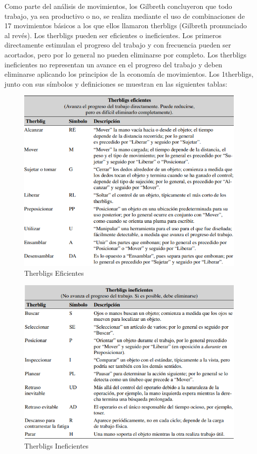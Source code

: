     Como parte del análisis de movimientos, los Gilbreth concluyeron que todo trabajo, ya sea productivo o no, se realiza mediante el uso de combinaciones de 17 movimientos básicos a los que ellos 
    llamaron therbligs (Gilbreth pronunciado al revés). Los therbligs pueden ser eficientes o ineficientes. 
    Los primeros directamente estimulan el progreso del trabajo y con frecuencia pueden ser acortados, pero por lo general no pueden eliminarse por completo. Los therbligs ineficientes no representan un avance en el progreso del trabajo y deben eliminarse aplicando los principios de la economía de movimientos. Los 1therbligs, junto con sus símbolos y definiciones se muestran en las siguientes tablas:
    
    \begin{figure}[H]
        \centering
        \includegraphics[scale=0.42]{35/Img/ther1.png}
        \caption{Therbligs Eficientes}
        \label{fig:therbligs1}
    \end{figure}
    
    \begin{figure}[H]
        \centering
        \includegraphics[scale=0.42]{35/Img/ther2.png}
        \caption{Therbligs Ineficientes}
        \label{fig:therbligs2}
    \end{figure}
    
